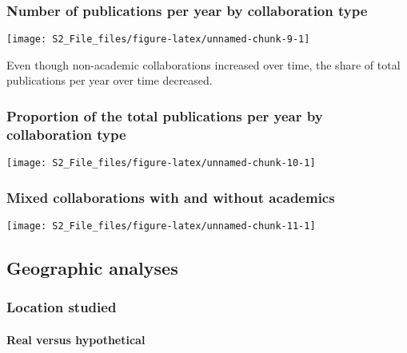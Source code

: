 \documentclass[
]{article}
\begin{document}
\hypertarget{number-of-publications-per-year-by-collaboration-type}{%
\subsubsection{Number of publications per year by collaboration
type}\label{number-of-publications-per-year-by-collaboration-type}}

\texttt{[image: S2\_File\_files/figure-latex/unnamed-chunk-9-1]}

Even though non-academic collaborations increased over time, the share
of total publications per year over time decreased.

\hypertarget{proportion-of-the-total-publications-per-year-by-collaboration-type}{%
\subsubsection{Proportion of the total publications per year by
collaboration
type}\label{proportion-of-the-total-publications-per-year-by-collaboration-type}}

\texttt{[image: S2\_File\_files/figure-latex/unnamed-chunk-10-1]}

\hypertarget{mixed-collaborations-with-and-without-academics}{%
\subsubsection{Mixed collaborations with and without
academics}\label{mixed-collaborations-with-and-without-academics}}

\texttt{[image: S2\_File\_files/figure-latex/unnamed-chunk-11-1]}

\hypertarget{geographic-analyses}{%
\subsection{Geographic analyses}\label{geographic-analyses}}

\hypertarget{location-studied}{%
\subsubsection{Location studied}\label{location-studied}}

\hypertarget{real-versus-hypothetical}{%
\paragraph{Real versus hypothetical}\label{real-versus-hypothetical}}
\end{document}
